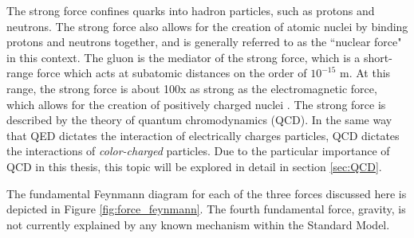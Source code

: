 The strong force confines quarks into hadron particles, such as protons and neutrons. The strong force also allows for the creation of atomic nuclei by binding protons and neutrons together, and is generally referred to as the ``nuclear force" in this context. The gluon is the mediator of the strong force, which is a short-range force which acts at subatomic distances on the order of $10^{-15}$ m. At this range, the strong force is about 100x as strong as the electromagnetic force, which allows for the creation of positively charged nuclei \cite{griffiths}. The strong force is described by the theory of quantum chromodynamics (QCD). In the same way that QED dictates the interaction of electrically charges particles, QCD dictates the interactions of \textit{color-charged} particles. Due to the particular importance of QCD in this thesis, this topic will be explored in detail in section \ref{sec:QCD}. \par

The fundamental Feynmann diagram for each of the three forces discussed here is depicted in Figure \ref{fig:force_feynmann}. The fourth fundamental force, gravity, is not currently explained by any known mechanism within the Standard Model. 

